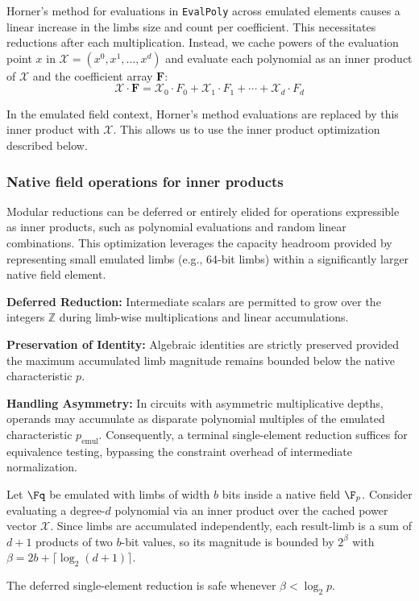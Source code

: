 Horner's method for evaluations in \texttt{EvalPoly} across emulated elements causes a linear increase in the limbs size and count per coefficient.
This necessitates reductions after each multiplication.
Instead, we cache powers of the evaluation point $x$ in $\mathcal{X} = (x^0, x^1, \ldots, x^d)$ and evaluate each polynomial as an inner product of $\mathcal{X}$ and the coefficient array $\mathbf{F}$:
$$\mathcal{X} \cdot \mathbf{F} = \mathcal{X}_0 \cdot F_0 + \mathcal{X}_1 \cdot F_1 + \cdots + \mathcal{X}_d \cdot F_d$$

In the emulated field context, Horner's method evaluations are replaced by this inner product with $\mathcal{X}$. This allows us to use the inner product optimization described below.

\subsubsection{Native field operations for inner products}

Modular reductions can be deferred or entirely elided for operations expressible as inner products, such as polynomial evaluations and random linear combinations. This optimization leverages the capacity headroom provided by representing small emulated limbs (e.g., 64-bit limbs) within a significantly larger native field element.

\textbf{Deferred Reduction:} Intermediate scalars are permitted to grow over the integers $\mathbb{Z}$ during limb-wise multiplications and linear accumulations.

\textbf{Preservation of Identity:} Algebraic identities are strictly preserved provided the maximum accumulated limb magnitude remains bounded below the native characteristic $p$.

\textbf{Handling Asymmetry:} In circuits with asymmetric multiplicative depths, operands may accumulate as disparate polynomial multiples of the emulated characteristic $p_{\text{emul}}$. Consequently, a terminal single-element reduction suffices for equivalence testing, bypassing the constraint overhead of intermediate normalization.

\begin{lemma}\label{lem:overflow}
Let $\Fq$ be emulated with limbs of width $b$ bits inside a native field $\F_p$.
Consider evaluating a degree-$d$ polynomial via an inner product over the cached
power vector $\mathcal{X}$.
Since limbs are accumulated independently, each result-limb is a sum of $d+1$
products of two $b$-bit values, so its magnitude is bounded by $2^{\beta}$ with $\beta = 2b + \lceil\log_2(d+1)\rceil$.

The deferred single-element reduction is safe whenever $\beta < \log_2 p$.
\end{lemma}

